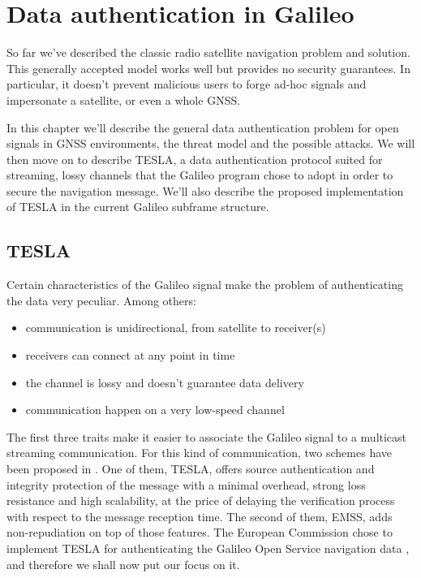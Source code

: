 
\chapter{Data authentication in Galileo}
\label{ch:data_auth}

So far we've described the classic radio satellite navigation problem and
solution. This generally accepted model works well but provides no security
guarantees. In particular, it doesn't prevent malicious users to forge ad-hoc
signals and impersonate a satellite, or even a whole GNSS.

In this chapter we'll describe the general data authentication problem for open
signals in GNSS environments, the threat model and the possible attacks. We will
then move on to describe TESLA, a data authentication protocol suited for
streaming, lossy channels that the Galileo program chose to adopt in order
to secure the navigation message. We'll also describe the proposed
implementation of TESLA in the current Galileo subframe structure.

\section{TESLA}
Certain characteristics of the Galileo signal make the problem of authenticating
the data very peculiar. Among others:
\begin{itemize}
  \item communication is unidirectional, from satellite to receiver(s)
  \item receivers can connect at any point in time
  \item the channel is lossy and doesn't guarantee data delivery
  \item communication happen on a very low-speed channel
\end{itemize}
The first three traits make it easier to associate the Galileo signal to a
multicast streaming communication. For this kind of communication, two schemes
have been proposed in \cite{perrig}. One of them, TESLA, offers source
authentication and integrity protection of the message with a minimal overhead,
strong loss resistance and high scalability, at the price of delaying the
verification process with respect to the message reception time. The second of
them, EMSS, adds non-repudiation on top of those features. The European
Commission chose to implement TESLA for authenticating the Galileo Open Service
navigation data \cite{osnma}, and therefore we shall now put our focus on it.

